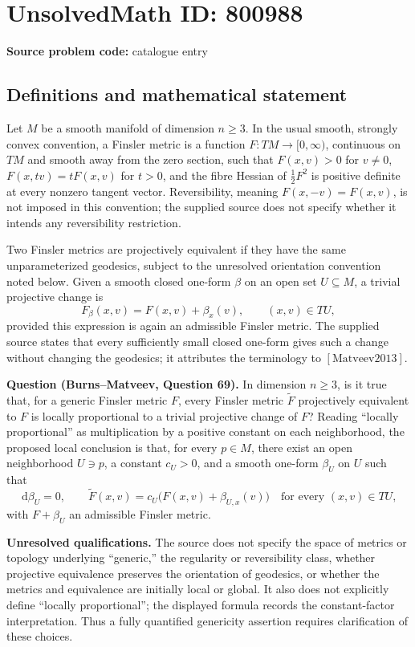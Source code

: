 \documentclass[11pt]{article}
\newcommand{\dd}{\,\mathrm{d}}
\begin{document}
\section*{UnsolvedMath ID: 800988}
\textbf{Source problem code:} catalogue entry
\subsection{Definitions and mathematical statement}
Let \(M\) be a smooth manifold of dimension \(n\geq 3\). In the usual smooth, strongly convex convention, a Finsler metric is a function \(F:TM\to[0,\infty)\), continuous on \(TM\) and smooth away from the zero section, such that \(F(x,v)>0\) for \(v\neq0\), \(F(x,tv)=tF(x,v)\) for \(t>0\), and the fibre Hessian of \(\tfrac12F^2\) is positive definite at every nonzero tangent vector. Reversibility, meaning \(F(x,-v)=F(x,v)\), is not imposed in this convention; the supplied source does not specify whether it intends any reversibility restriction.

Two Finsler metrics are projectively equivalent if they have the same unparameterized geodesics, subject to the unresolved orientation convention noted below. Given a smooth closed one-form \(\beta\) on an open set \(U\subseteq M\), a trivial projective change is
\[
F_\beta(x,v)=F(x,v)+\beta_x(v),\qquad (x,v)\in TU,
\]
provided this expression is again an admissible Finsler metric. The supplied source states that every sufficiently small closed one-form gives such a change without changing the geodesics; it attributes the terminology to \([\mathrm{Matveev2013}]\).

\textbf{Question (Burns--Matveev, Question 69).} In dimension \(n\geq3\), is it true that, for a generic Finsler metric \(F\), every Finsler metric \(\widetilde F\) projectively equivalent to \(F\) is locally proportional to a trivial projective change of \(F\)? Reading ``locally proportional'' as multiplication by a positive constant on each neighborhood, the proposed local conclusion is that, for every \(p\in M\), there exist an open neighborhood \(U\ni p\), a constant \(c_U>0\), and a smooth one-form \(\beta_U\) on \(U\) such that
\[
\dd\beta_U=0,\qquad
\widetilde F(x,v)=c_U\bigl(F(x,v)+\beta_{U,x}(v)\bigr)
\quad\text{for every }(x,v)\in TU,
\]
with \(F+\beta_U\) an admissible Finsler metric.

\textbf{Unresolved qualifications.} The source does not specify the space of metrics or topology underlying ``generic,'' the regularity or reversibility class, whether projective equivalence preserves the orientation of geodesics, or whether the metrics and equivalence are initially local or global. It also does not explicitly define ``locally proportional''; the displayed formula records the constant-factor interpretation. Thus a fully quantified genericity assertion requires clarification of these choices.
\end{document}
